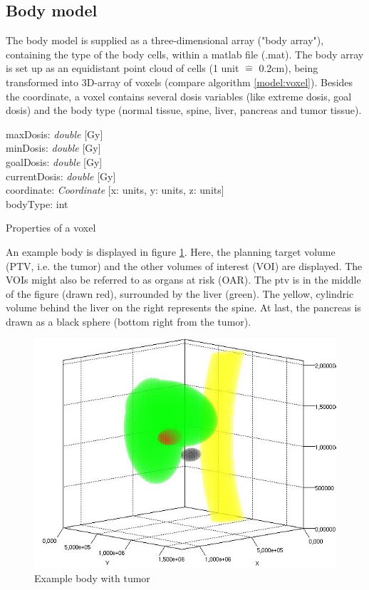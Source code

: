\documentclass[12pt]{article}
\begin{document}
\subsection{Body model}
The body model is supplied as a three-dimensional array ("body array"), containing the type of the body cells, within a matlab file (.mat). The body array is set up as an equidistant point cloud of cells (1 unit $\widehat{=}$ 0.2cm), being transformed into 3D-array of voxels (compare algorithm \ref{model:voxel}). Besides the coordinate, a voxel contains several dosis variables (like extreme dosis, goal dosis) and the body type (normal tissue, spine, liver, pancreas and tumor tissue). \\
\begin{algorithm}[H]
maxDosis: \textit{double} [Gy] \\
minDosis: \textit{double} [Gy] \\
goalDosis: \textit{double} [Gy] \\
currentDosis: \textit{double} [Gy] \\
coordinate: \textit{Coordinate} [x: units, y: units, z: units] \\
bodyType: int
\label{model:voxel}
\caption{Properties of a voxel}
\end{algorithm}

An example body is displayed in figure \ref{model:body}. Here, the planning target volume (PTV, i.e. the tumor) and the other volumes of interest (VOI) are displayed. The VOIs might also be referred to as organs at risk (OAR). The ptv is in the middle of the figure (drawn red), surrounded by the liver (green). The yellow, cylindric volume behind the liver on the right represents the spine. At last, the pancreas is drawn as a black sphere (bottom right from the tumor).
\begin{figure}
\centering
\includegraphics[width=.7\textwidth]{pictures/body}
\caption{Example body with tumor}
\label{model:body}
\end{figure}
\end{document}
